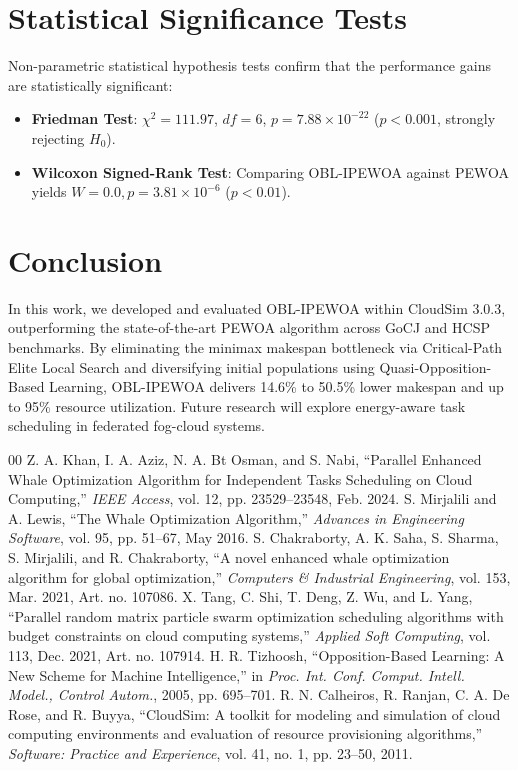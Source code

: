 \documentclass[journal]{IEEEtran}
\begin{document}
\section{Statistical Significance Tests}
Non-parametric statistical hypothesis tests confirm that the performance gains are statistically significant:
\begin{itemize}
    \item \textbf{Friedman Test}: $\chi^2 = 111.97$, $df = 6$, $p = 7.88 \times 10^{-22}$ ($p < 0.001$, strongly rejecting $H_0$).
    \item \textbf{Wilcoxon Signed-Rank Test}: Comparing OBL-IPEWOA against PEWOA yields $W = 0.0, p = 3.81 \times 10^{-6}$ ($p < 0.01$).
\end{itemize}

\section{Conclusion}
In this work, we developed and evaluated OBL-IPEWOA within CloudSim 3.0.3, outperforming the state-of-the-art PEWOA algorithm across GoCJ and HCSP benchmarks. By eliminating the minimax makespan bottleneck via Critical-Path Elite Local Search and diversifying initial populations using Quasi-Opposition-Based Learning, OBL-IPEWOA delivers 14.6\% to 50.5\% lower makespan and up to 95\% resource utilization. Future research will explore energy-aware task scheduling in federated fog-cloud systems.

\begin{thebibliography}{00}
 Z. A. Khan, I. A. Aziz, N. A. Bt Osman, and S. Nabi, ``Parallel Enhanced Whale Optimization Algorithm for Independent Tasks Scheduling on Cloud Computing,'' \textit{IEEE Access}, vol. 12, pp. 23529--23548, Feb. 2024.
 S. Mirjalili and A. Lewis, ``The Whale Optimization Algorithm,'' \textit{Advances in Engineering Software}, vol. 95, pp. 51--67, May 2016.
 S. Chakraborty, A. K. Saha, S. Sharma, S. Mirjalili, and R. Chakraborty, ``A novel enhanced whale optimization algorithm for global optimization,'' \textit{Computers \& Industrial Engineering}, vol. 153, Mar. 2021, Art. no. 107086.
 X. Tang, C. Shi, T. Deng, Z. Wu, and L. Yang, ``Parallel random matrix particle swarm optimization scheduling algorithms with budget constraints on cloud computing systems,'' \textit{Applied Soft Computing}, vol. 113, Dec. 2021, Art. no. 107914.
 H. R. Tizhoosh, ``Opposition-Based Learning: A New Scheme for Machine Intelligence,'' in \textit{Proc. Int. Conf. Comput. Intell. Model., Control Autom.}, 2005, pp. 695--701.
 R. N. Calheiros, R. Ranjan, C. A. De Rose, and R. Buyya, ``CloudSim: A toolkit for modeling and simulation of cloud computing environments and evaluation of resource provisioning algorithms,'' \textit{Software: Practice and Experience}, vol. 41, no. 1, pp. 23--50, 2011.
\end{thebibliography}
\end{document}
